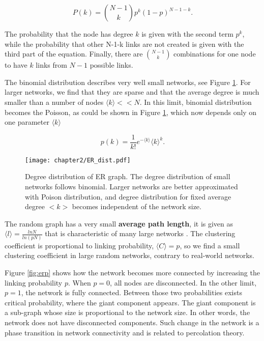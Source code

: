 \begin{equation}
P(k) = \binom{N-1}{k}p^k(1-p)^{N-1-k}.
\end{equation}

The probability that the node has degree $k$ is given with the second term $p^k$, while the probability that other N-1-k links are not created is given with the third part of the equation. Finally, there are  $\binom{N-1}{k}$ combinations for one node to have $k$ links from $N-1$ possible links. 

The binomial distribution describes very well small networks, see Figure \ref{fig:erdist}. For larger networks, we find that they are sparse and that the average degree is much smaller than a number of nodes $\langle k \rangle << N$. In this limit, binomial distribution becomes the Poisson, as could be shown in Figure \ref{fig:erdist}, which now depends only on one parameter $\langle k \rangle$

\begin{equation}
p(k) = \frac{1}{k!}e^{-\langle k \rangle}\langle k \rangle^{k}.
\end{equation}

\begin{figure}[H]
	\centering
	\texttt{[image: chapter2/ER\_dist.pdf]}
	\caption[Degree distribution of Erdős-R\' {e}nyi graph.]{Degree distribution of ER graph. The degree distribution of small networks follows binomial. Larger networks are better approximated with Poison distribution, and degree distribution for fixed average degree $<k>$ becomes independent of the network size.}
	\label{fig:erdist}
\end{figure}

The random graph has a very small \textbf{average path length}, it is given as $\langle l \rangle = \frac{ln N}{ln(pN)}$ that is characteristic of many large networks \cite{bollobas2003mathematical}. The clustering coefficient is proportional to linking probability, $\langle C \rangle = p$, so we find a small clustering coefficient in large random networks, contrary to real-world networks. 

Figure \ref{fig:erp} shows how the network becomes more connected by increasing the linking probability $p$. When $p=0$, all nodes are disconnected. In the other limit, $p=1$, the network is fully connected. Between those two probabilities exists critical probability, where the giant component appears. The giant component is a sub-graph whose size is proportional to the network size. In other words, the network does not have disconnected components. Such change in the network is a phase transition in network connectivity and is related to percolation theory. 

